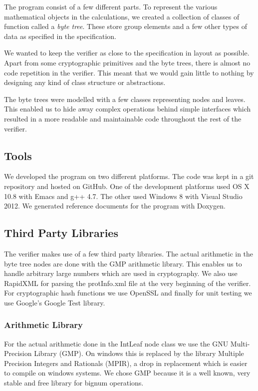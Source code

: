 The program consist of a few different parts. To represent the various mathematical objects in the calculations, we created a collection of classes of function called a \emph{byte tree}. These store group elements and a few other types of data as specified in the specification.

We wanted to keep the verifier as close to the specification in layout as possible. Apart from some cryptographic primitives and the byte trees, there is almost no code repetition in the verifier. This meant that we would gain little to nothing by designing any kind of class structure or abstractions.

The byte trees were modelled with a few classes representing nodes and leaves. This enabled us to hide away complex operations behind simple interfaces which resulted in a more readable and maintainable code throughout the rest of the verifier.

\subsection{Tools}

We developed the program on two different platforms. The code was kept in a git repository and hosted on GitHub. One of the development platforms used OS X 10.8 with Emacs and g++ 4.7. The other used Windows 8 with Visual Studio 2012. We generated reference documents for the program with Doxygen.

\subsection{Third Party Libraries}

The verifier makes use of a few third party libraries. The actual arithmetic in the byte tree nodes are done with the GMP arithmetic library. This enables us to handle arbitrary large numbers which are used in cryptography. We also use RapidXML for parsing the protInfo.xml file at the very beginning of the verifier. For cryptographic hash functions we use OpenSSL and finally for unit testing we use Google's Google Test library.

\subsubsection{Arithmetic Library}

For the actual arithmetic done in the IntLeaf node class we use the GNU Multi-Precision Library (GMP). On windows this is replaced by the library Multiple Precision Integers and Rationals (MPIR), a drop in replacement which is easier to compile on windows systems. We chose GMP because it is a well known, very stable and free library for bignum operations.

